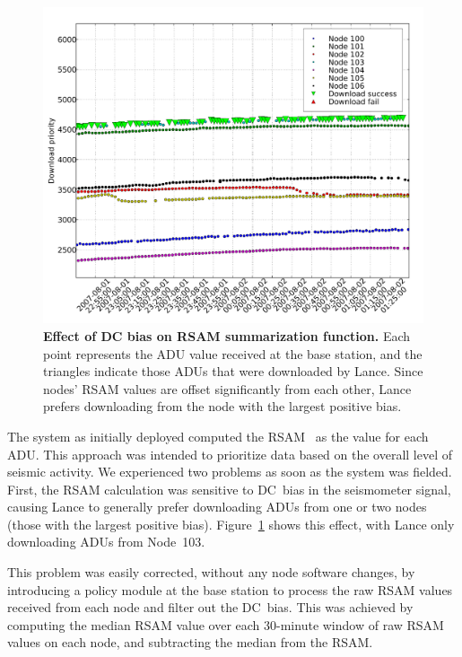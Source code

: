 \begin{figure}[t]
\begin{center}
\includegraphics[width=1.0\hsize]{./4-lance/figs/dcbias.pdf}
\end{center}

\caption{\textbf{Effect of DC bias on RSAM summarization function.} Each
point represents the ADU value received at the base station, and the
triangles indicate those ADUs that were downloaded by Lance. Since nodes'
RSAM values are offset significantly from each other, Lance prefers
downloading from the node with the largest positive bias.}

\label{lance-fig-dcbias}
\end{figure}

The system as initially deployed computed the RSAM~\cite{rsam} as the value
for each ADU. This approach was intended to prioritize data based on the
overall level of seismic activity. We experienced two problems as soon as the
system was fielded. First, the RSAM calculation was sensitive to DC~bias in
the seismometer signal, causing Lance to generally prefer downloading ADUs
from one or two nodes (those with the largest positive bias).
Figure~\ref{lance-fig-dcbias} shows this effect, with Lance only downloading
ADUs from Node~103.

This problem was easily corrected, without any node software changes, by
introducing a policy module at the base station to process the raw RSAM
values received from each node and filter out the DC~bias. This was achieved
by computing the median RSAM value over each 30-minute window of raw RSAM
values on each node, and subtracting the median from the RSAM.

